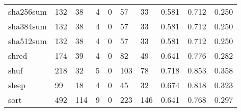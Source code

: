 \begin{longtable}{lp{1.3cm}p{1.3cm}p{1.3cm}p{1.3cm}p{1.3cm}p{1.3cm}p{1.3cm}p{1.3cm}p{1.3cm}}
sha256sum &                    132 &                                 38 &                                 4 &                                0 &                                57 &                              33 &                                0.581 &                                  0.712 &                                0.250 \\
sha384sum &                    132 &                                 38 &                                 4 &                                0 &                                57 &                              33 &                                0.581 &                                  0.712 &                                0.250 \\
sha512sum &                    132 &                                 38 &                                 4 &                                0 &                                57 &                              33 &                                0.581 &                                  0.712 &                                0.250 \\
shred     &                    174 &                                 39 &                                 4 &                                0 &                                82 &                              49 &                                0.641 &                                  0.776 &                                0.282 \\
shuf      &                    218 &                                 32 &                                 5 &                                0 &                               103 &                              78 &                                0.718 &                                  0.853 &                                0.358 \\
sleep     &                     99 &                                 18 &                                 4 &                                0 &                                45 &                              32 &                                0.674 &                                  0.818 &                                0.323 \\
sort      &                    492 &                                114 &                                 9 &                                0 &                               223 &                             146 &                                0.641 &                                  0.768 &                                0.297 \\

\end{longtable}
